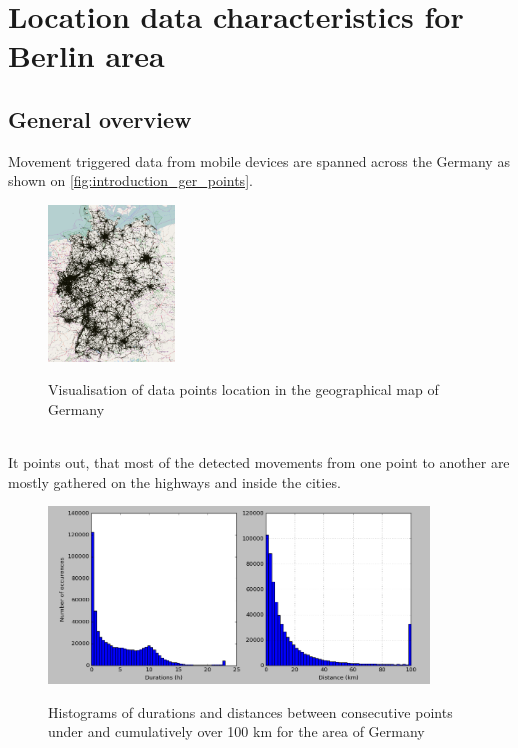 \section{Location data characteristics for Berlin area}

\subsection{General overview}

Movement triggered data from mobile devices are spanned across the Germany as shown on \autoref{fig:introduction_ger_points}. 
\\
\begin{figure}[!ht]
	\centering
	\includegraphics[width=0.3\textwidth]{images/points_germany.png}\\
	\caption{Visualisation of data points location in the geographical map of Germany}
	\label{fig:introduction_ger_points}
\end{figure}
\\
It points out, that most of the detected movements from one point to another are mostly gathered on the highways and inside the cities. 
\\
\begin{figure}[!ht]
	\centering
	\includegraphics[width=0.9\textwidth]{images/germany_stats.png}\\
	\caption{Histograms of durations and distances between consecutive points under and cumulatively over 100 km for the area of Germany}
	\label{fig:introduction_ger_stats}
\end{figure}
